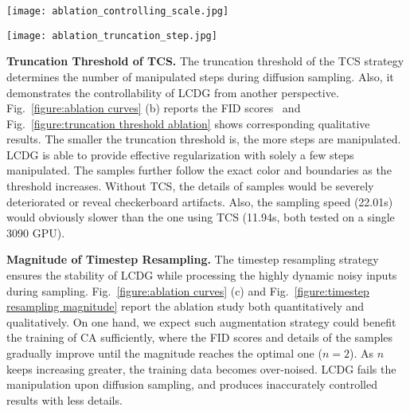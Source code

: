 \documentclass{article}
\begin{document}
\begin{figure*}[t!]
  \centering
  \texttt{[image: ablation\_controlling\_scale.jpg]} \vspace{-1em}
  \caption{Qualitative results for ablation studies of controlling scale.}
  \label{figure:controlling scale ablation}
  \vspace{-0.5em}
  \end{figure*}
  
  \begin{figure*}[t!]
  \centering
  \texttt{[image: ablation\_truncation\_step.jpg]} \vspace{-1em}
  \caption{Qualitative results for ablation studies of truncation threshold of TCS.}
  \label{figure:truncation threshold ablation}
  \vspace{-1em}  
\end{figure*}

\textbf{Truncation Threshold of TCS.} The truncation threshold of the TCS strategy determines the number of manipulated steps during diffusion sampling. Also, it demonstrates the controllability of LCDG from another perspective. Fig.~\ref{figure:ablation curves} (b) reports the FID scores~\cite{NIPS2017_8a1d6947} and Fig.~\ref{figure:truncation threshold ablation} shows corresponding qualitative results. The smaller the truncation threshold is, the more steps are manipulated. LCDG is able to provide effective regularization with solely a few steps manipulated. The samples further follow the exact color and boundaries as the threshold increases. Without TCS, the details of samples would be severely deteriorated or reveal checkerboard artifacts. Also, the sampling speed (22.01s) would obviously slower than the one using TCS (11.94s, both tested on a single 3090 GPU).

\textbf{Magnitude of Timestep Resampling.} The timestep resampling strategy ensures the stability of LCDG while processing the highly dynamic noisy inputs during sampling. Fig.~\ref{figure:ablation curves} (c) and Fig.~\ref{figure:timestep resampling magnitude} report the ablation study both quantitatively and qualitatively. On one hand, we expect such augmentation strategy could benefit the training of CA sufficiently, where the FID scores and details of the samples gradually improve until the magnitude reaches the optimal one ($n=2$). As $n$ keeps increasing greater, the training data becomes over-noised. LCDG fails the manipulation upon diffusion sampling, and produces inaccurately controlled results with less details.
\end{document}
